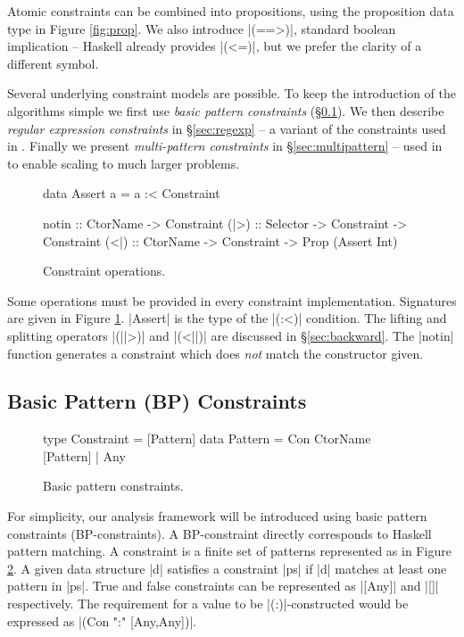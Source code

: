Atomic constraints can be combined into propositions, using the proposition data type in Figure \ref{fig:prop}. We also introduce |(==>)|, standard boolean implication -- Haskell already provides |(<=)|, but we prefer the clarity of a different symbol.

Several underlying constraint models are possible. To keep the introduction of the algorithms simple we first use \textit{basic pattern constraints} (\S\ref{sec:basic}). We then describe \textit{regular expression constraints} in \S\ref{sec:regexp} -- a variant of the constraints used in \oldtool{}. Finally we present \textit{multi-pattern constraints} in \S\ref{sec:multipattern} -- used in \newtool{} to enable scaling to much larger problems.

\begin{figure}
\begin{code}
data Assert a = a :< Constraint

notin :: CtorName -> Constraint
(|>) :: Selector -> Constraint -> Constraint
(<|) :: CtorName -> Constraint -> Prop (Assert Int)
\end{code}
\caption{Constraint operations.}
\label{fig:constraint}
\figureend
\end{figure}

Some operations must be provided in every constraint implementation. Signatures are given in Figure \ref{fig:constraint}. |Assert| is the type of the |(:<)| condition. The lifting and splitting operators |(||>)| and |(<||)| are discussed in \S\ref{sec:backward}. The |notin| function generates a constraint which does \textit{not} match the constructor given.


\subsection{Basic Pattern (BP) Constraints}
\label{sec:basic}

\begin{figure}
\begin{code}
type Constraint  =  [Pattern]
data Pattern     =  Con CtorName [Pattern] | Any
\end{code}
\caption{Basic pattern constraints.}
\label{fig:basic}
\figureend
\end{figure}

For simplicity, our analysis framework will be introduced using basic pattern constraints (BP-constraints). A BP-constraint directly corresponds to Haskell pattern matching. A constraint is a finite set of patterns represented as in Figure \ref{fig:basic}. A given data structure |d| satisfies a constraint |ps| if |d| matches at least one pattern in |ps|. True and false constraints can be represented as |[Any]| and |[]| respectively. The requirement for a value to be |(:)|-constructed would be expressed as |(Con ":" [Any,Any])|.

